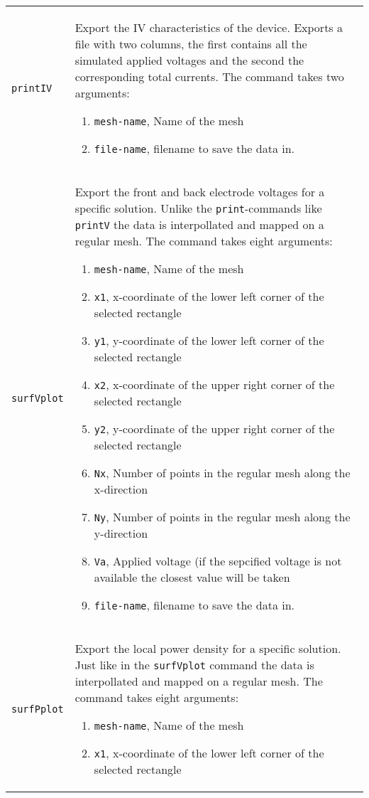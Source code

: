 \documentclass[noshowpacs,preprintnumbers,amsmath,amssymb, letter]{revtex4}
\begin{document}
\begin{longtable}{p{}p{}}
\texttt{printIV}		& Export the IV characteristics of the device. Exports a file with two columns, the first contains all the simulated applied voltages and the second the corresponding total currents. The command takes two arguments:
\begin{enumerate}
\item \texttt{mesh-name}, Name of the mesh
\item \texttt{file-name}, filename to save the data in.
\end{enumerate}\\
\texttt{surfVplot}		& Export the front and back electrode voltages for a specific solution. Unlike the \texttt{print}-commands like \texttt{printV} the data is interpollated and mapped on a regular mesh. The command takes eight arguments:
\begin{enumerate}
\item \texttt{mesh-name}, Name of the mesh
\item \texttt{x1}, x-coordinate of the lower left corner of the selected rectangle
\item \texttt{y1}, y-coordinate of the lower left corner of the selected rectangle
\item \texttt{x2}, x-coordinate of the upper right corner of the selected rectangle
\item \texttt{y2}, y-coordinate of the upper right corner of the selected rectangle
\item \texttt{Nx}, Number of points in the regular mesh along the x-direction
\item \texttt{Ny}, Number of points in the regular mesh along the y-direction
\item \texttt{Va}, Applied voltage (if the sepcified voltage is not available the closest value will be taken
\item \texttt{file-name}, filename to save the data in.
\end{enumerate}\\
\texttt{surfPplot}		& Export the local power density for a specific solution. Just like in the \texttt{surfVplot} command the data is interpollated and mapped on a regular mesh. The command takes eight arguments:
\begin{enumerate}
\item \texttt{mesh-name}, Name of the mesh
\item \texttt{x1}, x-coordinate of the lower left corner of the selected rectangle

\end{enumerate}
\end{longtable}
\end{document}
